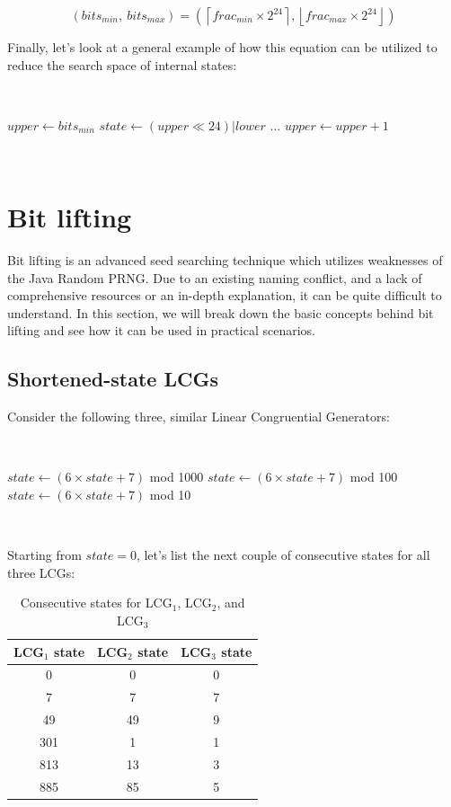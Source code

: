 \documentclass{article}
\begin{document}
\begin{equation}
    (bits_{min}, \ bits_{max}) = \left( \left\lceil frac_{min} \times 2^{24} \right\rceil, \left\lfloor frac_{max} \times 2^{24} \right\rfloor \right)
\end{equation}

Finally, let's look at a general example of how this equation can be utilized to reduce the search space of internal states:

\
\begin{algorithmic}
\State $upper \gets bits_{min}$
        \State $state \gets (upper \ll 24) | lower$
        \State ...
    \EndFor
    \State $upper \gets upper + 1$
\EndWhile
\end{algorithmic}
\ \

\section{Bit lifting}

Bit lifting is an advanced seed searching technique which utilizes weaknesses of the Java Random PRNG. Due to an existing naming conflict, and a lack of comprehensive resources or an in-depth explanation, it can be quite difficult to understand. In this section, we will break down the basic concepts behind bit lifting and see how it can be used in practical scenarios.

\subsection{Shortened-state LCGs}

Consider the following three, similar Linear Congruential Generators:

\
\begin{algorithmic}
    \State $state \gets (6 \times state + 7)$ mod 1000
    \Comment{LCG$_1$}
    \State $state \gets (6 \times state + 7)$ mod 100
    \Comment{LCG$_2$}
    \State $state \gets (6 \times state + 7)$ mod 10
    \Comment{LCG$_3$}
\end{algorithmic}
\ \

\noindent Starting from $state = 0$, let’s list the next couple of consecutive states for all three LCGs:

\begin{table}[h]
    \centering
    \begin{tabular}{|c|c|c|}
    \hline
         LCG$_1$ state & LCG$_2$ state & LCG$_3$ state \\
    \hline
         0 & 0 & 0   \\
         7 & 7 & 7   \\
         49 & 49 & 9  \\
         301 & 1 & 1   \\
         813 & 13 & 3  \\
         885 & 85 & 5  \\
    \hline
    \end{tabular}
    \caption{Consecutive states for LCG$_1$, LCG$_2$, and LCG$_3$}
    \label{tab:lcgs}
\end{table}
\end{document}
